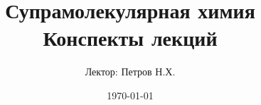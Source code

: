 
\author{Лектор: Петров Н.Х.}



\title{
	\textbf{Супрамолекулярная химия} \\
	\vspace{1in}
	{Конспекты лекций}
	\vspace{3.5in}
}
\date{\today} %

